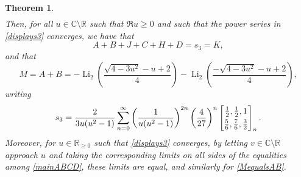 \documentclass[12pt]{article}
\newtheorem{theorem}{Theorem}
\begin{document}
\begin{theorem}
\begin{align*}
\end{align*} 
 Then, for all $u \in \mathbb{C} \setminus \mathbb{R}$ such that $\Re u \geq 0$ and such that the power series 
 in \eqref{displays3} converges, we have that 
\begin{equation}\label{mainABCD}
 A + B + J + C + H + D = s_3 = K, 
\end{equation}
 and that 
\begin{equation}\label{MequalsAB}
 M = A + B = 
 - \operatorname{Li}_{2}\left( \frac{\sqrt{4 - 3 u^2} - u + 2}{4} \right) 
 - \operatorname{Li}_{2}\left( \frac{-\sqrt{4 - 3 u^2} - u + 2}{4} \right), 
\end{equation}
 writing 
\begin{equation}\label{displays3}
 s_3 = \frac{2}{3u(u^2-1)} \sum_{n=0}^{\infty} \left( \frac{1}{u(u^2-1)} \right)^{2n} \left( \frac{4}{27} \right)^{n} 
 \left[ \begin{matrix} \frac{1}{2}, \frac{1}{2}, 1 
 \vspace{1mm} \\ 
 \frac{5}{6}, \frac{7}{6}, \frac{3}{2} \end{matrix} \right]_{n}. 
\end{equation}
 Moreover, for $u \in \mathbb{R}_{\geq 0}$ such that \eqref{displays3} converges, by letting $v \in \mathbb{C} \setminus \mathbb{R}$ 
 approach $u$ and taking the corresponding limits on all sides of the equalities among \eqref{mainABCD}, these limits are equal, 
 and similarly for \eqref{MequalsAB}. 
\end{theorem}
\end{document}
